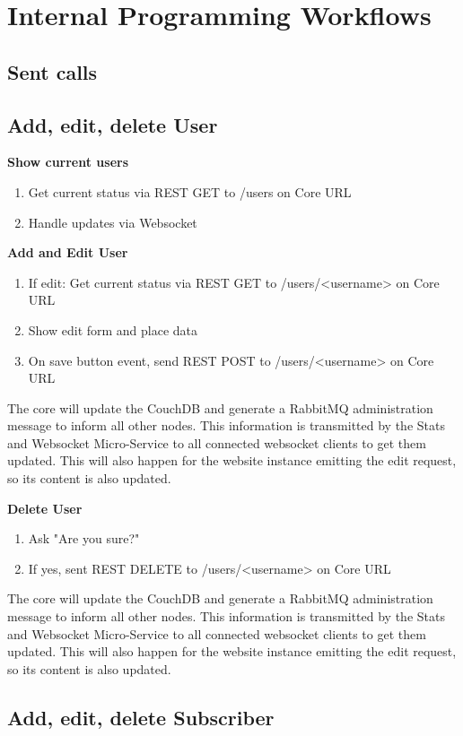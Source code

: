 \chapter{Internal Programming Workflows}

\section{Sent calls}

\section{Add, edit, delete User}
\textbf{Show current users}
\begin{enumerate}
	\item Get current status via REST GET to /users on Core URL
	\item Handle updates via Websocket
\end{enumerate}

\textbf{Add and Edit User}
\begin{enumerate}
	\item If edit: Get current status via REST GET to /users/<username> on Core URL
	\item Show edit form and place data
	\item On save button event, send REST POST to /users/<username> on Core URL
\end{enumerate}
The core will update the CouchDB and generate a RabbitMQ administration message to inform all other nodes. This information is transmitted by the Stats and Websocket Micro-Service to all connected websocket clients to get them updated. This will also happen for the website instance emitting the edit request, so its content is also updated.


\textbf{Delete User}
\begin{enumerate}
	\item Ask "Are you sure?"
	\item If yes, sent REST DELETE to /users/<username> on Core URL
\end{enumerate}
The core will update the CouchDB and generate a RabbitMQ administration message to inform all other nodes. This information is transmitted by the Stats and Websocket Micro-Service to all connected websocket clients to get them updated. This will also happen for the website instance emitting the edit request, so its content is also updated.

\section{Add, edit, delete Subscriber}

